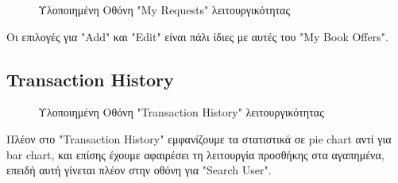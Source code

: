 \documentclass[12pt,a4paper]{article}
\begin{document}
\begin{figure}[H]
	\caption{Υλοποιημένη Οθόνη "My Requests" λειτουργικότητας}
	\label{Υλοποιημένη Οθόνη "My Requests" λειτουργικότητας}
\end{figure}

Οι επιλογές για "Add" και "Edit" είναι πάλι ίδιες με αυτές του "My Book Offers".

\subsection{Transaction History}

\begin{figure}[H]
	\caption{Υλοποιημένη Οθόνη "Transaction History" λειτουργικότητας}
	\label{Υλοποιημένη Οθόνη "Transaction History" λειτουργικότητας}
\end{figure}

Πλέον στο "Transaction History" εμφανίζουμε τα στατιστικά σε pie chart αντί για bar chart, και επίσης έχουμε αφαιρέσει τη λειτουργία προσθήκης στα αγαπημένα, επειδή αυτή γίνεται πλέον στην οθόνη για "Search User".
\end{document}
